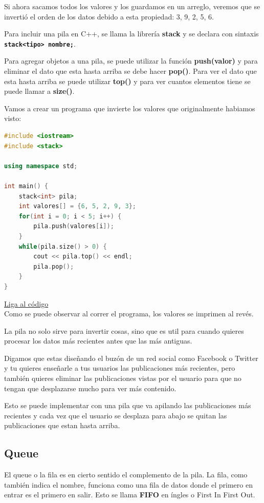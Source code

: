 \documentclass{article}
\begin{document}
Si ahora sacamos todos los valores y los guardamos en un arreglo, veremos que se invertió el orden de los datos debido a esta propiedad: {3, 9, 2, 5, 6}.

Para incluir una pila en C++, se llama la librería \textbf{stack} y se declara con sintaxis \textbf{\lstinline{stack<tipo> nombre;}}.

Para agregar objetos a una pila, se puede utilizar la función \textbf{push(valor)} y para eliminar el dato que esta hasta arriba se debe hacer \textbf{pop()}. Para ver el dato que esta hasta arriba se puede utilizar \textbf{top()} y para ver cuantos elementos tiene se puede llamar a \textbf{size()}.

Vamos a crear un programa que invierte los valores que originalmente habiamos visto:

\begin{lstlisting}[language=C++, caption=Pilas]
#include <iostream>
#include <stack>

using namespace std;

int main() {
    stack<int> pila;
    int valores[] = {6, 5, 2, 9, 3};
    for(int i = 0; i < 5; i++) {
        pila.push(valores[i]);
    }
    while(pila.size() > 0) {
        cout << pila.top() << endl;
        pila.pop();
    }
}
\end{lstlisting}
\href{https://repl.it/@Jamesscn/Cargando-pilas}{Liga al código} \\

Como se puede observar al correr el programa, los valores se imprimen al revés.

La pila no solo sirve para invertir cosas, sino que es util para cuando quieres procesar los datos más recientes antes que las más antiguas.

Digamos que estas diseñando el buzón de un red social como Facebook o Twitter y tu quieres enseñarle a tus usuarios las publicaciones más recientes, pero también quieres eliminar las publicaciones vistas por el usuario para que no tengan que desplazarse mucho para ver más contenido.

Esto se puede implementar con una pila que va apilando las publicaciones más recientes y cada vez que el usuario se desplaza para abajo se quitan las publicaciones que estan hasta arriba.

\subsection{Queue}

El queue o la fila es en cierto sentido el complemento de la pila. La fila, como también indica el nombre, funciona como una fila de datos donde el primero en entrar es el primero en salir. Esto se llama \textbf{FIFO} en íngles o First In First Out.
\end{document}
